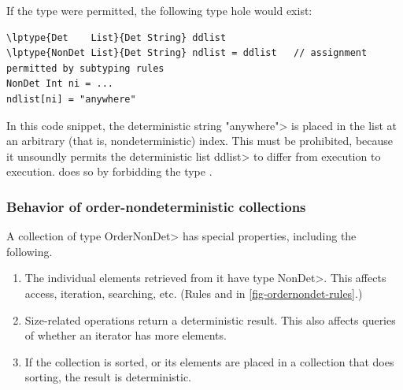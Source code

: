 
If the type  were
permitted, the following type hole would exist:

\begin{Verbatim}[commandchars=\\\{\}]
\lptype{Det    List}{Det String} ddlist
\lptype{NonDet List}{Det String} ndlist = ddlist   // assignment permitted by subtyping rules
NonDet Int ni = ...
ndlist[ni] = "anywhere"
\end{Verbatim}

\noindent
In this code snippet,
the deterministic string \<"anywhere"> is placed in the list at an
arbitrary (that is, nondeterministic) index.  This must be prohibited,
because it unsoundly permits the deterministic list \<ddlist> to differ
from execution to execution.  \OurTypeSystem does so by forbidding the type
.


\subsubsection{Behavior of order-nondeterministic collections}\label{sec:ond-behavior}

A collection of type \<OrderNonDet> has special properties, including the following.

\begin{enumerate}
\item
The individual elements retrieved from it have type \<NonDet>.  This
affects access, iteration, searching, etc.
(Rules  and  in \cref{fig-ordernondet-rules}.)
\item
Size-related operations return a deterministic result.  This also affects
queries of whether an iterator has more elements.
\item
If the collection is sorted, or its elements are placed in a collection
that does sorting, the result is deterministic.
\end{enumerate}

